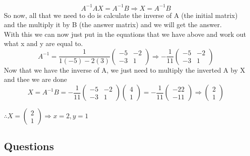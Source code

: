 \documentclass{article}
\begin{document}
\[
	A^{-1}AX = A^{-1}B \Rightarrow X = A^{-1}B
\]
So now, all that we need to do is calculate the inverse of A (the initial matrix) and the multiply it by B (the answer matrix) and we will get the answer.
\\
With this we can now just put in the equations that we have above and work out what x and y are equal to.
\[
	A^{-1} = \frac{1}{1(-5) - 2(3)} 
	\begin{pmatrix}
		-5 & -2\\
		-3 & 1
	\end{pmatrix}
	\Rightarrow
	- \frac{1}{11}
	\begin{pmatrix}
		-5 & -2\\
		-3 & 1
	\end{pmatrix}
\]
Now that we have the inverse of A, we just need to multiply the inverted A by X and thee we are done
\[
	X = A^{-1}B = - \frac{1}{11}
	\begin{pmatrix}
		-5 & -2\\
		-3 & 1
	\end{pmatrix}
	\begin{pmatrix}
		4\\
		1
	\end{pmatrix}
	=
	- \frac{1}{11}
	\begin{pmatrix}
		-22\\
		-11
	\end{pmatrix}
	\Rightarrow
	\begin{pmatrix}
		2\\
		1
	\end{pmatrix}
\]
\begin{center}\vspace{0.5cm}$\therefore X = 
	\begin{pmatrix}
		2\\
		1
	\end{pmatrix}
	\Rightarrow
x = 2, y = 1$\end{center}
\subsection{Questions}
\end{document}

